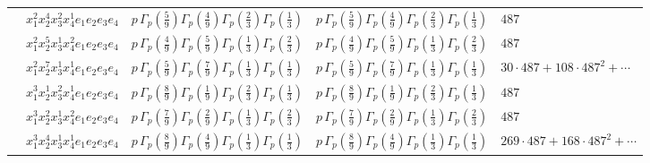 \documentclass[11pt]{article}
\begin{document}
\begin{table}[ht]
{\begin{tabular}{@{}lllll@{}}
 & $x_{1}^{2} x_{2}^{4} x_{3}^{2} x_{4}^{1}  e_{1} e_{2} e_{3} e_{4}$ & $p \, \Gamma_p \left( \frac{5}{9} \right) \Gamma_p \left( \frac{4}{9} \right) \Gamma_p \left( \frac{2}{3} \right) \Gamma_p \left( \frac{1}{3} \right)$ & $p \, \Gamma_p \left( \frac{5}{9} \right) \Gamma_p \left( \frac{4}{9} \right) \Gamma_p \left( \frac{2}{3} \right) \Gamma_p \left( \frac{1}{3} \right)$ & $487$ \\
 & $x_{1}^{2} x_{2}^{5} x_{3}^{1} x_{4}^{2}  e_{1} e_{2} e_{3} e_{4}$ & $p \, \Gamma_p \left( \frac{4}{9} \right) \Gamma_p \left( \frac{5}{9} \right) \Gamma_p \left( \frac{1}{3} \right) \Gamma_p \left( \frac{2}{3} \right)$ & $p \, \Gamma_p \left( \frac{4}{9} \right) \Gamma_p \left( \frac{5}{9} \right) \Gamma_p \left( \frac{1}{3} \right) \Gamma_p \left( \frac{2}{3} \right)$ & $487$ \\
 & $x_{1}^{2} x_{2}^{7} x_{3}^{1} x_{4}^{1}  e_{1} e_{2} e_{3} e_{4}$ & $p \, \Gamma_p \left( \frac{5}{9} \right) \Gamma_p \left( \frac{7}{9} \right) \Gamma_p \left( \frac{1}{3} \right) \Gamma_p \left( \frac{1}{3} \right)$ & $p \, \Gamma_p \left( \frac{5}{9} \right) \Gamma_p \left( \frac{7}{9} \right) \Gamma_p \left( \frac{1}{3} \right) \Gamma_p \left( \frac{1}{3} \right)$ & $30{\cdot}487{+}108{\cdot}487^{2}{+}\cdots$ \\
 & $x_{1}^{3} x_{2}^{1} x_{3}^{2} x_{4}^{1}  e_{1} e_{2} e_{3} e_{4}$ & $p \, \Gamma_p \left( \frac{8}{9} \right) \Gamma_p \left( \frac{1}{9} \right) \Gamma_p \left( \frac{2}{3} \right) \Gamma_p \left( \frac{1}{3} \right)$ & $p \, \Gamma_p \left( \frac{8}{9} \right) \Gamma_p \left( \frac{1}{9} \right) \Gamma_p \left( \frac{2}{3} \right) \Gamma_p \left( \frac{1}{3} \right)$ & $487$ \\
 & $x_{1}^{3} x_{2}^{2} x_{3}^{1} x_{4}^{2}  e_{1} e_{2} e_{3} e_{4}$ & $p \, \Gamma_p \left( \frac{7}{9} \right) \Gamma_p \left( \frac{2}{9} \right) \Gamma_p \left( \frac{1}{3} \right) \Gamma_p \left( \frac{2}{3} \right)$ & $p \, \Gamma_p \left( \frac{7}{9} \right) \Gamma_p \left( \frac{2}{9} \right) \Gamma_p \left( \frac{1}{3} \right) \Gamma_p \left( \frac{2}{3} \right)$ & $487$ \\
 & $x_{1}^{3} x_{2}^{4} x_{3}^{1} x_{4}^{1}  e_{1} e_{2} e_{3} e_{4}$ & $p \, \Gamma_p \left( \frac{8}{9} \right) \Gamma_p \left( \frac{4}{9} \right) \Gamma_p \left( \frac{1}{3} \right) \Gamma_p \left( \frac{1}{3} \right)$ & $p \, \Gamma_p \left( \frac{8}{9} \right) \Gamma_p \left( \frac{4}{9} \right) \Gamma_p \left( \frac{1}{3} \right) \Gamma_p \left( \frac{1}{3} \right)$ & $269{\cdot}487{+}168{\cdot}487^{2}{+}\cdots$ \\

\end{tabular}}
\end{table}
\end{document}
